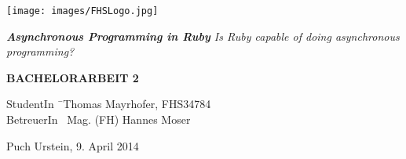 \begin{titlepage}
\begin{center}

\texttt{[image: images/FHSLogo.jpg]}

\vspace*{4cm}

\Large{
	\textit{
		\textbf{Asynchronous Programming in Ruby} 
		\linebreak 
		Is Ruby capable of doing asynchronous programming?
	}
}

\vspace*{4cm}

\large{
	\textbf{BACHELORARBEIT 2}
}

\end{center}

\vfill

\begin{tabbing}
StudentIn \= \ Thomas Mayrhofer, FHS34784 \\
BetreuerIn \> \ Mag. (FH) Hannes Moser
\end{tabbing}

Puch Urstein, 9. April 2014

\end{titlepage}